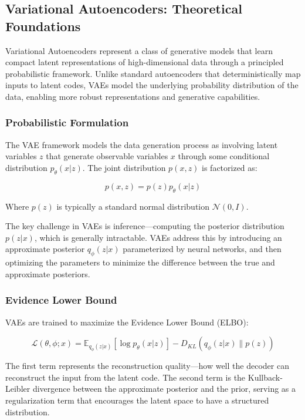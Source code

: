 \documentclass[conference]{IEEEtran}
\begin{document}
\subsection{Variational Autoencoders: Theoretical Foundations}

Variational Autoencoders represent a class of generative models that learn compact latent representations of high-dimensional data through a principled probabilistic framework. Unlike standard autoencoders that deterministically map inputs to latent codes, VAEs model the underlying probability distribution of the data, enabling more robust representations and generative capabilities.

\subsubsection{Probabilistic Formulation}

The VAE framework models the data generation process as involving latent variables $z$ that generate observable variables $x$ through some conditional distribution $p_\theta(x|z)$. The joint distribution $p(x,z)$ is factorized as:

\begin{equation}
p(x,z) = p(z)p_\theta(x|z)
\end{equation}

Where $p(z)$ is typically a standard normal distribution $\mathcal{N}(0,I)$.

The key challenge in VAEs is inference—computing the posterior distribution $p(z|x)$, which is generally intractable. VAEs address this by introducing an approximate posterior $q_\phi(z|x)$ parameterized by neural networks, and then optimizing the parameters to minimize the difference between the true and approximate posteriors.

\subsubsection{Evidence Lower Bound}

VAEs are trained to maximize the Evidence Lower Bound (ELBO):

\begin{equation}
\mathcal{L}(\theta, \phi; x) = \mathbb{E}_{q_\phi(z|x)}[\log p_\theta(x|z)] - D_{KL}(q_\phi(z|x) \| p(z))
\end{equation}

The first term represents the reconstruction quality—how well the decoder can reconstruct the input from the latent code. The second term is the Kullback-Leibler divergence between the approximate posterior and the prior, serving as a regularization term that encourages the latent space to have a structured distribution.
\end{document}
